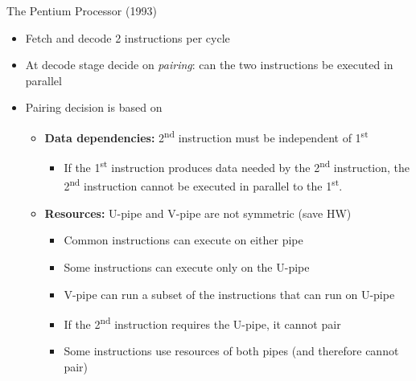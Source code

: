 \documentclass[aspectratio=169]{beamer}
\begin{document}
\begin{frame}{The Pentium\textregistered{} Processor (1993)}
\begin{itemize}
  \item Fetch and decode 2 instructions per cycle
  \item At decode stage decide on \emph{pairing}: can the two instructions be executed in parallel
  \item Pairing decision is based on
  \begin{itemize}
    \item \textbf{Data dependencies:} 2\textsuperscript{nd} instruction must be independent of 1\textsuperscript{st}
    \begin{itemize}
      \item If the 1\textsuperscript{st} instruction produces data needed by the 2\textsuperscript{nd} instruction, the 2\textsuperscript{nd} instruction cannot be executed in parallel to the 1\textsuperscript{st}.
    \end{itemize}
    \item \textbf{Resources:} U-pipe and V-pipe are not symmetric (save HW)
    \begin{itemize}
      \item Common instructions can execute on either pipe
      \item Some instructions can execute only on the U-pipe
      \item V-pipe can run a subset of the instructions that can run on U-pipe
      \item If the 2\textsuperscript{nd} instruction requires the U-pipe, it cannot pair
      \item Some instructions use resources of both pipes (and therefore cannot pair)
    \end{itemize}
  \end{itemize}
\end{itemize}
\end{frame}
\end{document}
